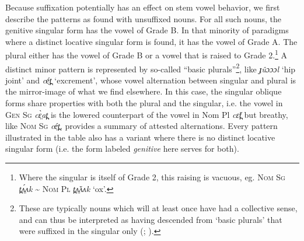 \documentclass[output=paper,newtxmath,modfonts,nonflat,draftmode]{langsci/langscibook}
\begin{document}
Because suffixation potentially has an effect on stem vowel behavior, we first describe the patterns as found with unsuffixed nouns. For all such nouns, the genitive singular form has the vowel of Grade B. In that minority of paradigms where a distinct locative singular form is found, it has the vowel of Grade A. The plural either has the vowel of Grade B or a vowel that is raised to Grade 2.\footnote{Where\label{fn:monich:11} the singular is itself of Grade 2, this raising is vacuous, eg. \textsc{Nom Sg} \textit{t̪ʌ̤́ʌk} {\textasciitilde} \textsc{Nom Pl} \textit{t̪ʌ̤̌ʌʌk} ‘ox’.}  A distinct minor pattern is represented by so-called “basic plurals”\footnote{These\label{fn:monich:12} are typically nouns which will at least once have had a collective sense, and can thus be interpreted as having descended from ‘basic plurals’ that were suffixed in the singular only (\citealt{Storch2005}; \citealt{Dimmendaal2000}).}, like \textit{ɟûɔɔɔl} ‘hip joint’ and \textit{cé̤t̪} ‘excrement’, whose vowel alternation between  singular and plural is the mirror-image of what we find elsewhere. In this case, the singular oblique forms share properties with both the  plural and the  singular, i.e. the vowel in \textsc{Gen Sg} \textit{cɛ̤̀at̪} is the lowered counterpart of the vowel in Nom Pl \textit{cɛ̌t̪} but breathy, like \textsc{Nom Sg} \textit{cé̤t̪}.  provides a summary of attested  alternations. Every pattern illustrated in the table also has a variant where there is no distinct locative singular form (i.e. the form labeled \textit{genitive} here serves for both).

\begin{table}
\caption{Vowel quality variation in nominal paradigms (Eastern Nuer)}
\label{tab:monich:17}
\end{table}
\end{document}
